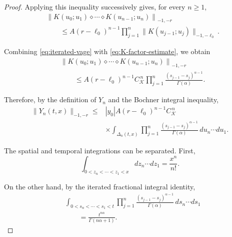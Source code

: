 \documentclass[10pt,a4paper]{amsart}
\begin{document}
\begin{proof}
Applying this inequality successively gives, for every $n\geq1$,
\begin{equation}
\begin{aligned}
&
\left\|
K(u_0;u_1)\diamond\cdots\diamond
K(u_{n-1};u_n)
\right\|_{-1,-r}
\\
&\qquad\leq
A(r-\ell_0)^{n-1}
\prod_{j=1}^{n}
\|K(u_{j-1};u_j)\|_{-1,-\ell_0}.
\end{aligned}
\label{eq:iterated-vage}
\end{equation}

Combining \eqref{eq:iterated-vage} with
\eqref{eq:K-factor-estimate}, we obtain
\begin{equation}
\begin{aligned}
&
\left\|
K(u_0;u_1)\diamond\cdots\diamond
K(u_{n-1};u_n)
\right\|_{-1,-r}
\\
&\qquad\leq
A(r-\ell_0)^{n-1}
C_{\mathcal K}^{\,n}
\prod_{j=1}^{n}
\frac{(s_{j-1}-s_j)^{\alpha-1}}
{\Gamma(\alpha)}.
\end{aligned}
\label{eq:wick-product-bound}
\end{equation}

Therefore, by the definition of $Y_n$ and the Bochner integral inequality,
\begin{equation}
\begin{aligned}
\|Y_n(t,x)\|_{-1,-r}
\leq{}&
|y_0|
A(r-\ell_0)^{n-1}
C_{\mathcal K}^{\,n}
\\
&\times
\int_{\Delta_n(t,x)}
\prod_{j=1}^{n}
\frac{(s_{j-1}-s_j)^{\alpha-1}}
{\Gamma(\alpha)}
\,du_n\cdots du_1.
\end{aligned}
\label{eq:Yn-bound1}
\end{equation}

The spatial and temporal integrations can be separated. First,
\begin{equation}
\int_{0<z_n<\cdots<z_1<x}
dz_n\cdots dz_1
=
\frac{x^n}{n!}.
\label{eq:spatial-simplex}
\end{equation}

On the other hand, by the iterated fractional integral identity,
\begin{equation}
\begin{aligned}
&
\int_{0<s_n<\cdots<s_1<t}
\prod_{j=1}^{n}
\frac{(s_{j-1}-s_j)^{\alpha-1}}
{\Gamma(\alpha)}
\,ds_n\cdots ds_1
\\
&\qquad=
\frac{t^{n\alpha}}
{\Gamma(n\alpha+1)}.
\end{aligned}
\label{eq:fractional-simplex}
\end{equation}


\end{proof}
\end{document}
